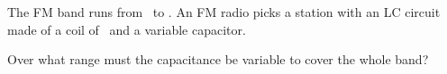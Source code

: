 The FM band runs from \faO\ to \fbO. An FM radio picks a station with an LC circuit made of a coil of \LO\ and a variable capacitor.

Over what range must the capacitance be variable to cover the whole band?
